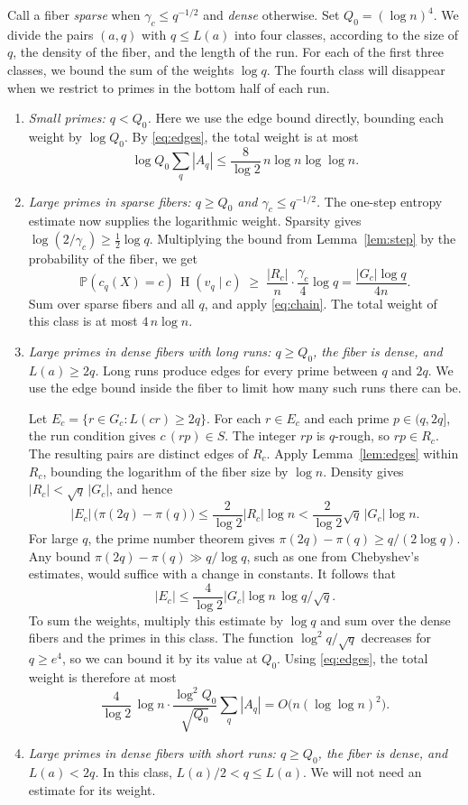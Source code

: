 \documentclass[11pt]{article}
\theoremstyle{remark}
\newcommand{\Pp}{\mathbb{P}}
\DeclareMathOperator{\HH}{H}
\begin{document}
Call a fiber \emph{sparse} when $\gamma_c\le q^{-1/2}$ and \emph{dense} otherwise.
Set $Q_0=(\log n)^4$.
We divide the pairs $(a,q)$ with $q\le L(a)$ into four classes, according to the size of $q$, the density of the fiber, and the length of the run.
For each of the first three classes, we bound the sum of the weights $\log q$.
The fourth class will disappear when we restrict to primes in the bottom half of each run.

\begin{enumerate}[label=\textbf{Class \arabic*.},leftmargin=*,itemsep=4pt]
\item \emph{Small primes: $q<Q_0$.}
Here we use the edge bound directly, bounding each weight by $\log Q_0$.
By \eqref{eq:edges}, the total weight is at most
\[
  \log Q_0\sum_q|A_q|\le\frac{8}{\log 2}\,n\log n\log\log n.
\]

\item \emph{Large primes in sparse fibers: $q\ge Q_0$ and $\gamma_c\le q^{-1/2}$.}
The one-step entropy estimate now supplies the logarithmic weight.
Sparsity gives $\log(2/\gamma_c)\ge\frac12\log q$.
Multiplying the bound from Lemma~\ref{lem:step} by the probability of the fiber, we get
\[
  \Pp(c_q(X)=c)\,\HH(v_q\mid c)\;\ge\;\frac{|R_c|}{n}\cdot\frac{\gamma_c}{4}\log q=\frac{|G_c|\log q}{4n}.
\]
Sum over sparse fibers and all $q$, and apply \eqref{eq:chain}.
The total weight of this class is at most $4\,n\log n$.

\item \emph{Large primes in dense fibers with long runs: $q\ge Q_0$, the fiber is dense, and $L(a)\ge 2q$.}
Long runs produce edges for every prime between $q$ and $2q$.
We use the edge bound inside the fiber to limit how many such runs there can be.

Let $E_c=\{r\in G_c : L(cr)\ge 2q\}$.
For each $r\in E_c$ and each prime $p\in(q,2q]$, the run condition gives $c\,(rp)\in S$.
The integer $rp$ is $q$-rough, so $rp\in R_c$.
The resulting pairs are distinct edges of $R_c$.
Apply Lemma~\ref{lem:edges} within $R_c$, bounding the logarithm of the fiber size by $\log n$.
Density gives $|R_c|<\sqrt q\,|G_c|$, and hence
\[
  |E_c|\,\bigl(\pi(2q)-\pi(q)\bigr)\le\frac{2}{\log 2}|R_c|\log n<\frac{2}{\log 2}\sqrt q\,|G_c|\log n .
\]
For large $q$, the prime number theorem gives $\pi(2q)-\pi(q)\ge q/(2\log q)$.
Any bound $\pi(2q)-\pi(q)\gg q/\log q$, such as one from Chebyshev's estimates, would suffice with a change in constants.
It follows that
\[
  |E_c|\le\frac{4}{\log 2}|G_c|\log n\,\log q/\sqrt q.
\]
To sum the weights, multiply this estimate by $\log q$ and sum over the dense fibers and the primes in this class.
The function $\log^2q/\sqrt q$ decreases for $q\ge e^4$, so we can bound it by its value at $Q_0$.
Using \eqref{eq:edges}, the total weight is therefore at most
\[
  \frac{4}{\log2}\,\log n\cdot\frac{\log^2Q_0}{\sqrt{Q_0}}\sum_q|A_q| = O\bigl(n(\log\log n)^2\bigr).
\]

\item \emph{Large primes in dense fibers with short runs: $q\ge Q_0$, the fiber is dense, and $L(a)<2q$.}
In this class, $L(a)/2<q\le L(a)$.
We will not need an estimate for its weight.
\end{enumerate}
\end{document}
